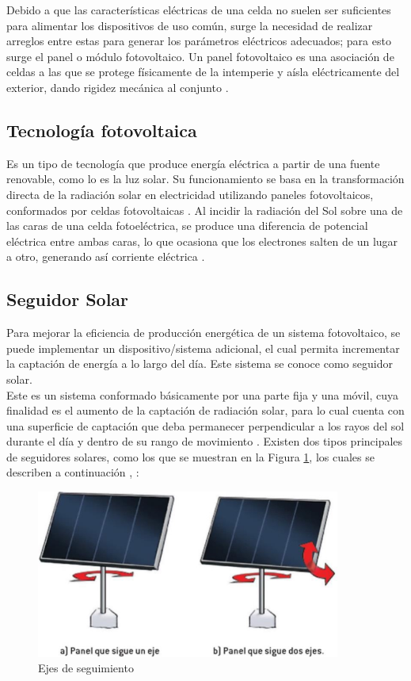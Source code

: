 Debido a que las características eléctricas de una celda no suelen ser suficientes para alimentar los dispositivos de uso común, surge la necesidad de realizar arreglos entre estas para generar los parámetros eléctricos adecuados; para esto surge el panel o módulo fotovoltaico. Un panel fotovoltaico es una asociación de celdas a las que se protege físicamente de la intemperie y aísla eléctricamente del exterior, dando rigidez mecánica al conjunto \cite{M1}.

\subsection{Tecnología fotovoltaica}
Es un tipo de tecnología que produce energía eléctrica a partir de una fuente renovable, como lo es la luz solar. Su funcionamiento se basa en la transformación directa de la radiación solar en electricidad utilizando paneles fotovoltaicos, conformados por celdas fotovoltaicas \cite{M2:2019:Online}. Al incidir la radiación del Sol sobre una de las caras de una celda fotoeléctrica, se produce una diferencia de potencial eléctrica entre ambas caras, lo que ocasiona que los electrones salten de un lugar a otro, generando así corriente eléctrica \cite{M3:2019:Online}.

\subsection{Seguidor Solar}
Para mejorar la eficiencia de producción energética de un sistema fotovoltaico, se puede implementar un dispositivo/sistema adicional, el cual permita incrementar la captación de energía a lo largo del día. Este sistema se conoce como seguidor solar.\\

\newpage
Este es un sistema conformado básicamente por una parte fija y una móvil, cuya finalidad es el aumento de la captación de radiación solar, para lo cual cuenta con una superficie de captación que deba permanecer perpendicular a los rayos del sol durante el día y dentro de su rango de movimiento \cite{M4}. Existen dos tipos principales de seguidores solares, como los que se muestran en la Figura \ref{fig:paneleje}, los cuales se describen a continuación \cite{M4}, \cite{M5}:

\begin{figure}[H]
	\centering
	\includegraphics[width=10cm]{imagenes/panel}
	\caption{Ejes de seguimiento}
	\label{fig:paneleje}
\end{figure}

